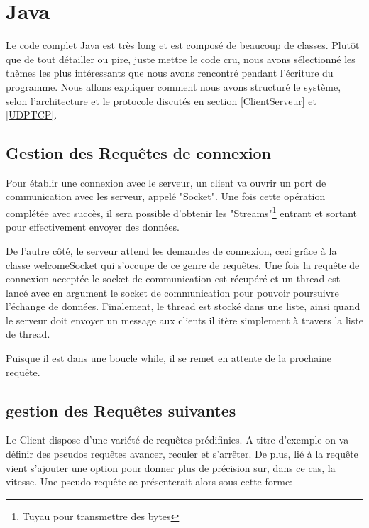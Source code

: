 \documentclass[a4paper,11pt]{report}
\begin{document}
{\section{Java}
Le code complet Java est très long et est composé de beaucoup de classes. Plutôt que de tout détailler ou pire, juste mettre le code cru, nous avons sélectionné les thèmes les plus intéressants que nous avons rencontré pendant l'écriture du programme. Nous allons expliquer comment nous avons structuré le système, selon l'architecture et le protocole discutés en section \ref{ClientServeur} et \ref{UDPTCP}.

\subsection{Gestion des Requêtes de connexion}
Pour établir une connexion avec le serveur, un client va ouvrir un port de communication avec les serveur, appelé "Socket". Une fois cette opération complétée avec succès, il sera possible d'obtenir les "Streams"\footnote{Tuyau pour transmettre des bytes} entrant et sortant pour effectivement envoyer des données.



De l'autre côté, le serveur attend les demandes de connexion, ceci grâce à la classe welcomeSocket qui s'occupe de ce genre de requêtes. Une fois la requête de connexion acceptée le socket de communication est récupéré et un thread est lancé avec en argument le socket de communication pour pouvoir poursuivre l'échange de données. Finalement, le thread est stocké dans une liste, ainsi quand le serveur doit envoyer un message aux clients il itère simplement à travers la liste de thread.

 
 
 Puisque il est dans une boucle while, il se remet en attente de la prochaine requête.
 
 \subsection{gestion des Requêtes suivantes}
 Le Client dispose d'une variété de requêtes prédifinies. A titre d'exemple on va définir des pseudos requêtes avancer, reculer et s'arrêter. De plus, lié à la requête vient s'ajouter une option pour donner plus de précision sur, dans ce cas, la vitesse. Une pseudo requête se présenterait alors sous cette forme:
 
}
\end{document}
